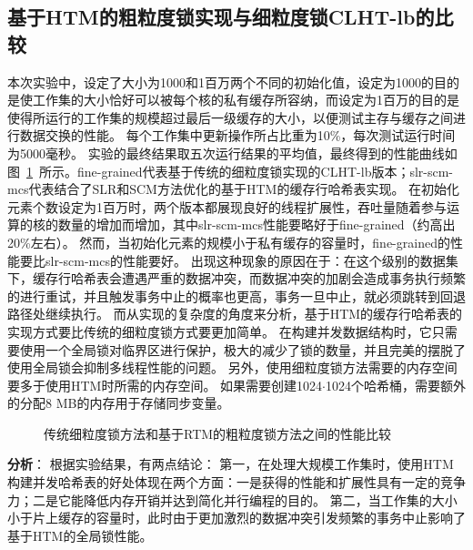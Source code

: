 \subsection{基于HTM的粗粒度锁实现与细粒度锁CLHT-lb的比较}
本次实验中，设定了大小为1000和1百万两个不同的初始化值，设定为1000的目的是使工作集的大小恰好可以被每个核的私有缓存所容纳，而设定为1百万的目的是使得所运行的工作集的规模超过最后一级缓存的大小，以便测试主存与缓存之间进行数据交换的性能。
每个工作集中更新操作所占比重为10\%，每次测试运行时间为5000毫秒。
实验的最终结果取五次运行结果的平均值，最终得到的性能曲线如图~\ref{fig:htm_coarse_grained}~所示。fine-grained代表基于传统的细粒度锁实现的CLHT-lb版本；slr-scm-mcs代表结合了SLR和SCM方法优化的基于HTM的缓存行哈希表实现。
在初始化元素个数设定为1百万时，两个版本都展现良好的线程扩展性，吞吐量随着参与运算的核的数量的增加而增加，其中slr-scm-mcs性能要略好于fine-grained（约高出20\%左右）。
然而，当初始化元素的规模小于私有缓存的容量时，fine-grained的性能要比slr-scm-mcs的性能要好。
出现这种现象的原因在于：在这个级别的数据集下，缓存行哈希表会遭遇严重的数据冲突，而数据冲突的加剧会造成事务执行频繁的进行重试，并且触发事务中止的概率也更高，事务一旦中止，就必须跳转到回退路径处继续执行。
而从实现的复杂度的角度来分析，基于HTM的缓存行哈希表的实现方式要比传统的细粒度锁方式要更加简单。
在构建并发数据结构时，它只需要使用一个全局锁对临界区进行保护，极大的减少了锁的数量，并且完美的摆脱了使用全局锁会抑制多线程性能的问题。
另外，使用细粒度锁方法需要的内存空间要多于使用HTM时所需的内存空间。
如果需要创建1024$\cdot$1024个哈希桶，需要额外的分配8 MB的内存用于存储同步变量。

\begin{figure}[htbp]
\centering
\caption{传统细粒度锁方法和基于RTM的粗粒度锁方法之间的性能比较}
\label{fig:htm_coarse_grained}
\end{figure}

\textbf{分析}： 根据实验结果，有两点结论：
第一，在处理大规模工作集时，使用HTM构建并发哈希表的好处体现在两个方面：一是获得的性能和扩展性具有一定的竞争力；二是它能降低内存开销并达到简化并行编程的目的。
第二，当工作集的大小小于片上缓存的容量时，此时由于更加激烈的数据冲突引发频繁的事务中止影响了基于HTM的全局锁性能。

